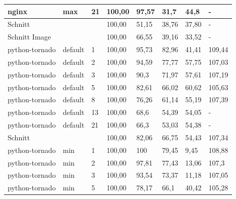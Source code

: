 \begin{footnotesize}
\begin{longtable}{llllllll}
		nginx          & max     & 21         & 100,00 & 97,57                       & 31,7                           & 44,8   & -      \\ \hline
		Schnitt        &         &            & 100,00 & 51,15                       & 38,76                          & 37,80  & -      \\ \hline
		Schnitt Image  &         &            & 100,00 & 66,55                       & 39,16                          & 33,52  & -      \\ \hline
		python-tornado & default & 1          & 100,00 & 95,73                       & 82,96                          & 41,41  & 109,44 \\
		python-tornado & default & 2          & 100,00 & 94,59                       & 77,77                          & 57,75  & 107,03 \\
		python-tornado & default & 3          & 100,00 & 90,3                        & 71,97                          & 57,61  & 107,19 \\
		python-tornado & default & 5          & 100,00 & 82,61                       & 66,02                          & 60,62  & 105,63 \\
		python-tornado & default & 8          & 100,00 & 76,26                       & 61,14                          & 55,19  & 107,39 \\
		python-tornado & default & 13         & 100,00 & 68,6                        & 54,39                          & 54,05  & -      \\
		python-tornado & default & 21         & 100,00 & 66,3                        & 53,03                          & 54,38  & -      \\ \hline
		Schnitt        &         &            & 100,00 & 82,06                       & 66,75                          & 54,43  & 107,34 \\ \hline
		python-tornado & min     & 1          & 100,00 & \cellcolor[HTML]{C0C0C0}100 & 79,45                          & 9,45   & 108,88 \\
		python-tornado & min     & 2          & 100,00 & 97,81                       & 77,43                          & 13,06  & 107,3  \\
		python-tornado & min     & 3          & 100,00 & 93,54                       & 73,37                          & 11,18  & 107,05 \\
		python-tornado & min     & 5          & 100,00 & 78,17                       & 66,1                           & 40,42  & 105,28 \\

\end{longtable}
\end{footnotesize}
